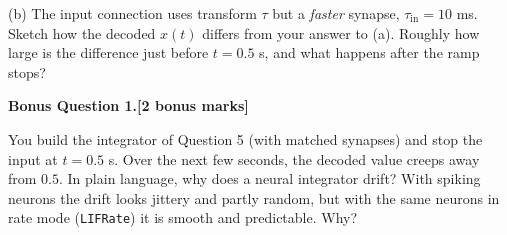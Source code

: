 \documentclass[11pt,letterpaper]{article}
\newcommand{\answerbox}[1]{\par\noindent\framebox[\linewidth]{\rule{0pt}{#1}}\par}
\begin{document}
(b) The input connection uses transform $\tau$ but a \emph{faster} synapse, $\tau_{\mathrm{in}} = 10$ ms. Sketch how the decoded $x(t)$ differs from your answer to (a). Roughly how large is the difference just before $t = 0.5$ s, and what happens after the ramp stops?
\answerbox{3.6cm}
\vspace{1.6cm}

\newpage
\textbf{Bonus Question 1.}\hfill\textbf{[2 bonus marks]}\par
You build the integrator of Question 5 (with matched synapses) and stop the input at $t = 0.5$ s. Over the next few seconds, the decoded value creeps away from $0.5$. In plain language, why does a neural integrator drift? With spiking neurons the drift looks jittery and partly random, but with the same neurons in rate mode (\texttt{LIFRate}) it is smooth and predictable. Why?
\vspace{5cm}
\end{document}
